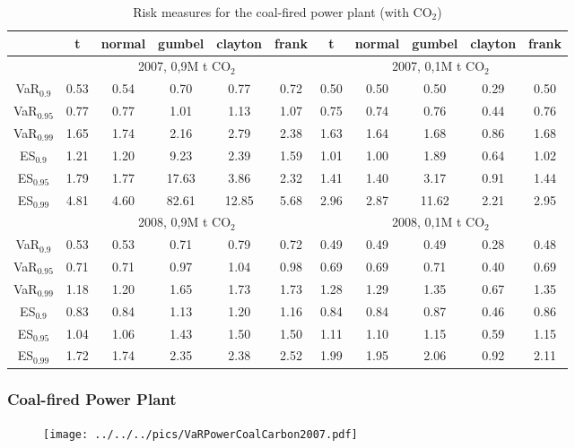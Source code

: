 {{            \begin{table}[!ht]
                \begin{center}
                    \begin{tabular}{c|c|c|c|c|c|c|c|c|c|c}
                        &t&normal&gumbel&clayton&frank&t&normal&gumbel&clayton&frank\\\hline
                        &\multicolumn{5}{c|}{2007, 0,9M t CO$_2$}&\multicolumn{5}{|c}{2007, 0,1M t CO$_2$}\\\cline{2-11}
                        VaR$_{0.9}$&0.53&0.54&0.70&0.77&0.72&0.50&0.50&0.50&0.29&0.50\\
                        VaR$_{0.95}$&0.77&0.77&1.01&1.13&1.07&0.75&0.74&0.76&0.44&0.76\\
                        VaR$_{0.99}$&1.65&1.74&2.16&2.79&2.38&1.63&1.64&1.68&0.86&1.68\\
                        ES$_{0.9}$&1.21&1.20&9.23&2.39&1.59&1.01&1.00&1.89&0.64&1.02\\
                        ES$_{0.95}$&1.79&1.77&17.63&3.86&2.32&1.41&1.40&3.17&0.91&1.44\\
                        ES$_{0.99}$&4.81&4.60&82.61&12.85&5.68&2.96&2.87&11.62&2.21&2.95\\\cline{2-11}
                        &\multicolumn{5}{c|}{2008, 0,9M t CO$_2$}&\multicolumn{5}{|c}{2008, 0,1M t CO$_2$}\\\cline{2-11}
                        VaR$_{0.9}$&0.53&0.53&0.71&0.79&0.72&0.49&0.49&0.49&0.28&0.48\\
                        VaR$_{0.95}$&0.71&0.71&0.97&1.04&0.98&0.69&0.69&0.71&0.40&0.69\\
                        VaR$_{0.99}$&1.18&1.20&1.65&1.73&1.73&1.28&1.29&1.35&0.67&1.35\\
                        ES$_{0.9}$&0.83&0.84&1.13&1.20&1.16&0.84&0.84&0.87&0.46&0.86\\
                        ES$_{0.95}$&1.04&1.06&1.43&1.50&1.50&1.11&1.10&1.15&0.59&1.15\\
                        ES$_{0.99}$&1.72&1.74&2.35&2.38&2.52&1.99&1.95&2.06&0.92&2.11
                    \end{tabular}
                    \caption{Risk measures for the coal-fired power plant (with CO$_2$)}
                \end{center}
            \end{table}
} \frame\frametitle{Coal-fired Power Plant}
\begin{figure}
\begin{center}
\texttt{[image: ../../../pics/VaRPowerCoalCarbon2007.pdf]}
\end{center}
\end{figure}

}
